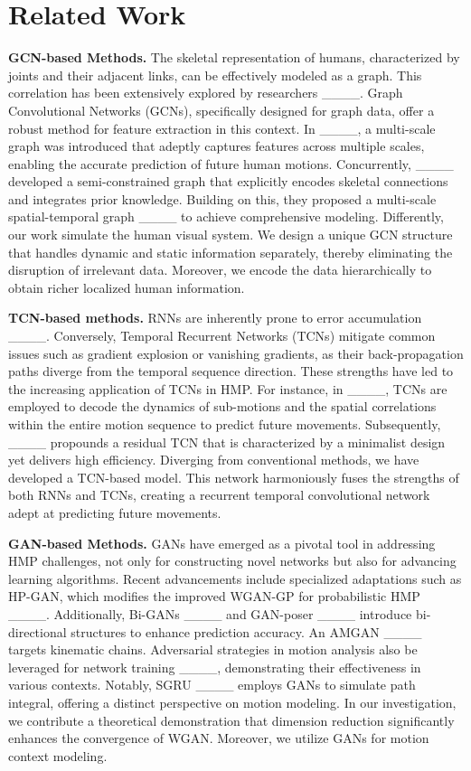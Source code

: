 \section{Related Work}
\textbf{GCN-based Methods.}\quad
The skeletal representation of humans, characterized by joints and their adjacent links, can be effectively modeled as a graph. This correlation has been extensively explored by researchers ____. Graph Convolutional Networks (GCNs), specifically designed for graph data, offer a robust method for feature extraction in this context.
In ____, a multi-scale graph was introduced that adeptly captures features across multiple scales, enabling the accurate prediction of future human motions. Concurrently, ____ developed a semi-constrained graph that explicitly encodes skeletal connections and integrates prior knowledge. Building on this, they proposed a multi-scale spatial-temporal graph ____ to achieve comprehensive modeling.
Differently, our work simulate the human visual system. We design a unique GCN structure that handles dynamic and static information separately, thereby eliminating the disruption of irrelevant data. Moreover, we encode the data hierarchically to obtain richer localized human information.

\textbf{TCN-based methods.} \quad
RNNs are inherently prone to error accumulation ____. Conversely, Temporal Recurrent Networks (TCNs) mitigate common issues such as gradient explosion or vanishing gradients, as their back-propagation paths diverge from the temporal sequence direction. These strengths have led to the increasing application of TCNs in HMP.  
For instance, in ____, TCNs are employed to decode the dynamics of sub-motions and the spatial correlations within the entire motion sequence to predict future movements. Subsequently, ____ propounds a residual TCN that is characterized by a minimalist design yet delivers high efficiency.
Diverging from conventional methods, we have developed a TCN-based model. This network harmoniously fuses the strengths of both RNNs and TCNs, creating a recurrent temporal convolutional network adept at predicting future movements. 

\textbf{GAN-based Methods.} \quad
GANs have emerged as a pivotal tool in addressing HMP challenges, not only for constructing novel networks but also for advancing learning algorithms. Recent advancements include specialized adaptations such as HP-GAN, which modifies the improved WGAN-GP for probabilistic HMP ____. Additionally, Bi-GANs ____ and GAN-poser ____ introduce bi-directional structures to enhance prediction accuracy. An AMGAN ____ targets kinematic chains.
Adversarial strategies in motion analysis also be leveraged for network training ____, demonstrating their effectiveness in various contexts. Notably, SGRU ____ employs GANs to simulate path integral, offering a distinct perspective on motion modeling.
In our investigation, we contribute a theoretical demonstration that dimension reduction significantly enhances the convergence of WGAN. Moreover, we utilize GANs for motion context modeling.

